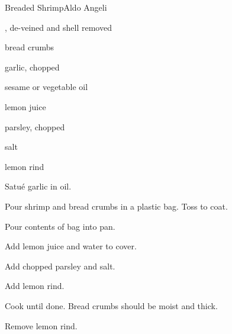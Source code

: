 \begin{recipe}{Breaded Shrimp}{Aldo Angeli}{}

\begin{ingredients}
\item {}, de-veined and shell removed
\item bread crumbs
\item garlic, chopped
\item sesame or vegetable oil
\item lemon juice
\item parsley, chopped
\item salt
\item lemon rind
\end{ingredients}

\begin{directions}
\item Satu\'e garlic in oil.
\item Pour shrimp and bread crumbs in a plastic bag. Toss to coat.
\item Pour contents of bag into pan.
\item Add lemon juice and water to cover.
\item Add chopped parsley and salt.
\item Add lemon rind.
\item Cook until done. Bread crumbs should be moist and thick.
\item Remove lemon rind.
\end{directions}

\end{recipe}
